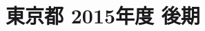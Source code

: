 \documentclass[../../hsm_tok_q.tex]{subfiles}
\begin{document}
    \section{東京都 2015年度 後期}
    \subsection{　}
    
    \newpage
    \subsection{　}
    
    \newpage
    \subsection{　}
    
    \newpage
    \subsection{　}
    
    \newpage
    \subsection{　}
    
\end{document}
